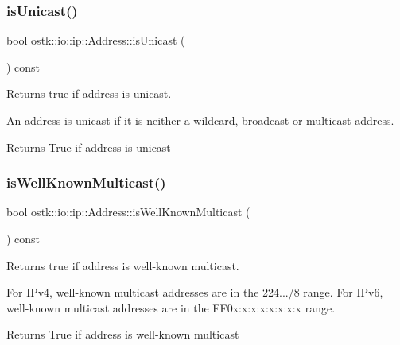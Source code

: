 \subsubsection{\texorpdfstring{is\+Unicast()}{isUnicast()}}
{\footnotesize\ttfamily bool ostk\+::io\+::ip\+::\+Address\+::is\+Unicast (\begin{DoxyParamCaption}{ }\end{DoxyParamCaption}) const}



Returns true if address is unicast. 

An address is unicast if it is neither a wildcard, broadcast or multicast address.

\begin{DoxyReturn}{Returns}
True if address is unicast 
\end{DoxyReturn}
\mbox{\label{classostk_1_1io_1_1ip_1_1_address_ac76c961e27406418258aa525f805b1e4}} 
\subsubsection{\texorpdfstring{is\+Well\+Known\+Multicast()}{isWellKnownMulticast()}}
{\footnotesize\ttfamily bool ostk\+::io\+::ip\+::\+Address\+::is\+Well\+Known\+Multicast (\begin{DoxyParamCaption}{ }\end{DoxyParamCaption}) const}



Returns true if address is well-\/known multicast. 

For I\+Pv4, well-\/known multicast addresses are in the 224.../8 range. For I\+Pv6, well-\/known multicast addresses are in the F\+F0x\+:x\+:x\+:x\+:x\+:x\+:x\+:x range.

\begin{DoxyReturn}{Returns}
True if address is well-\/known multicast 
\end{DoxyReturn}
\mbox{\label{classostk_1_1io_1_1ip_1_1_address_ae099697de04ec30bac8f9d371ec02e14}} 
